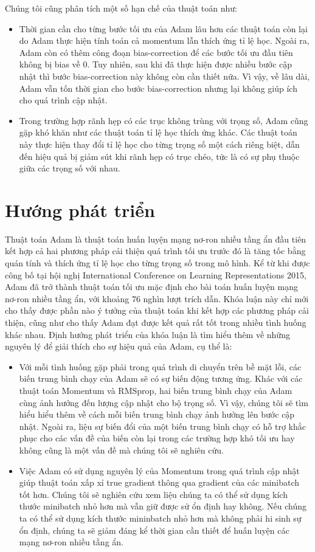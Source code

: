 Chúng tôi cũng phân tích một số hạn chế của thuật toán như:

\begin{itemize}
	\item Thời gian cần cho từng bước tối ưu của Adam lâu hơn các thuật toán còn lại do Adam thực hiện tính toán cả momentum lẫn thích ứng tỉ lệ học. Ngoài ra, Adam còn có thêm công đoạn bias-correction để các bước tối ưu đầu tiên không bị bias về 0. Tuy nhiên, sau khi đã thực hiện được nhiều bước cập nhật thì bước bias-correction này không còn cần thiết nữa. Vì vậy, về lâu dài, Adam vẫn tốn thời gian cho bước bias-correction nhưng lại không giúp ích cho quá trình cập nhật.
	\item Trong trường hợp rãnh hẹp có các trục không trùng với trọng số, Adam cũng gặp khó khăn như các thuật toán tỉ lệ học thích ứng khác. Các thuật toán này thực hiện thay đổi tỉ lệ học cho từng trọng số một cách riêng biệt, dẫn đến hiệu quả bị giảm sút khi rãnh hẹp có trục chéo, tức là có sự phụ thuộc giữa các trọng số với nhau.
\end{itemize}

\section{Hướng phát triển}

Thuật toán Adam là thuật toán huấn luyện mạng nơ-ron nhiều tầng ẩn đầu tiên kết hợp cả hai phương pháp cải thiện quá trình tối ưu trước đó là tăng tốc bằng quán tính và thích ứng tỉ lệ học cho từng trọng số trong mô hình. Kể từ khi được công bố tại hội nghị International Conference on Learning Representations 2015, Adam đã trở thành thuật toán tối ưu mặc định cho bài toán huấn luyện mạng nơ-ron nhiều tầng ẩn, với khoảng 76 nghìn lượt trích dẫn. Khóa luận này chỉ mới cho thấy được phần nào ý tưởng của thuật toán khi kết hợp các phương pháp cải thiện, cũng như cho thấy Adam đạt được kết quả rất tốt trong nhiều tình huống khác nhau. Định hướng phát triển của khóa luận là tìm hiểu thêm về những nguyên lý để giải thích cho sự hiệu quả của Adam, cụ thể là:

\begin{itemize}
	\item Với mỗi tình huống gặp phải trong quá trình di chuyển trên bề mặt lỗi, các biến trung bình chạy của Adam sẽ có sự biến động tương ứng. Khác với các thuật toán Momentum và RMSprop, hai biến trung bình chạy của Adam cùng ảnh hưởng đến lượng cập nhật cho bộ trọng số. Vì vậy, chúng tôi sẽ tìm hiểu hiểu thêm về cách mỗi biến trung bình chạy ảnh hưởng lên bước cập nhật. Ngoài ra, liệu sự biến đổi của một biến trung bình chạy có hỗ trợ khắc phục cho các vấn đề của biến còn lại trong các trường hợp khó tối ưu hay không cũng là một vấn đề mà chúng tôi sẽ nghiên cứu.
	\item Việc Adam có sử dụng nguyên lý của Momentum trong quá trình cập nhật giúp thuật toán xấp xỉ true gradient thông qua gradient của các minibatch tốt hơn. Chúng tôi sẽ nghiên cứu xem liệu chúng ta có thể sử dụng kích thước minibatch nhỏ hơn mà vẫn giữ được sử ổn định hay không. Nếu chúng ta có thể sử dụng kích thước mininbatch nhỏ hơn mà không phải hi sinh sự ổn định, chúng ta sẽ giảm đáng kể thời gian cần thiết để huấn luyện các mạng nơ-ron nhiều tầng ẩn.
\end{itemize}